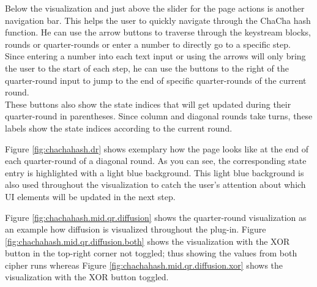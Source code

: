 Below the visualization and just above the slider for the page actions is another navigation bar. This helps the user to quickly navigate through the ChaCha hash function. He can use the arrow buttons to traverse through the keystream blocks, rounds or quarter-rounds or enter a number to directly go to a specific step. \\
Since entering a number into each text input or using the arrows will only bring the user to the start of each step, he can use the buttons to the right of the quarter-round input to jump to the end of specific quarter-rounds of the current round. \\
These buttons also show the state indices that will get updated during their quarter-round in parentheses. Since column and diagonal rounds take turns, these labels show the state indices according to the current round.

Figure \ref{fig:chachahash.dr} shows exemplary how the page looks like at the end of each quarter-round of a diagonal round. As you can see, the corresponding state entry is highlighted with a light blue background. This light blue background is also used throughout the visualization to catch the user's attention about which UI elements will be updated in the next step.

\pagebreak

Figure \ref{fig:chachahash.mid.qr.diffusion} shows the quarter-round visualization as an example how diffusion is visualized throughout the plug-in. Figure \ref{fig:chachahash.mid.qr.diffusion.both} shows the visualization with the XOR button in the top-right corner not toggled; thus showing the values from both cipher runs whereas Figure \ref{fig:chachahash.mid.qr.diffusion.xor} shows the visualization with the XOR button toggled.

